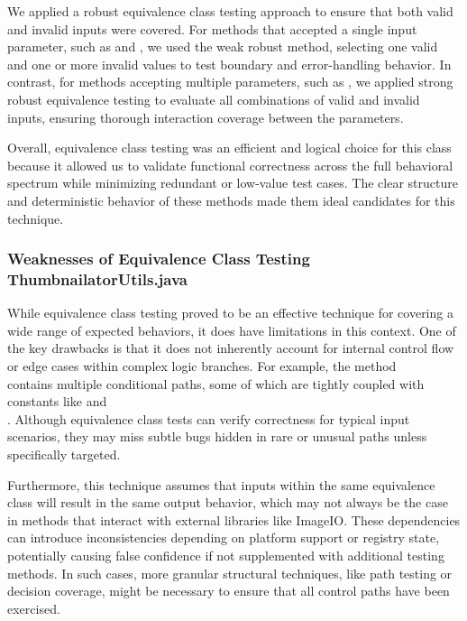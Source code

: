 \documentclass[12pt]{article}
\begin{document}
    We applied a robust equivalence class testing approach to ensure that both
        valid and invalid inputs were covered.
    For methods that accepted a single input parameter, such as
         and
        , we used the weak robust
        method, selecting one valid and one or more invalid values to test
        boundary and error-handling behavior.
    In contrast, for methods accepting multiple parameters, such as
        , we
        applied strong robust equivalence testing to evaluate all combinations
        of valid and invalid inputs, ensuring thorough interaction coverage
        between the parameters.

    Overall, equivalence class testing was an efficient and logical choice for
        this class because it allowed us to validate functional correctness
        across the full behavioral spectrum while minimizing redundant or
        low-value test cases.
    The clear structure and deterministic behavior of these methods made them
        ideal candidates for this technique.

    \markboth{}{}
    \subsubsection{Weaknesses of Equivalence Class Testing ThumbnailatorUtils.java}
    \markboth{}{}

    While equivalence class testing proved to be an effective technique for
        covering a wide range of expected behaviors, it does have limitations in
        this context.
    One of the key drawbacks is that it does not inherently account for internal
        control flow or edge cases within complex logic branches.
    For example, the method\\
     contains
        multiple conditional paths, some of which are tightly coupled with
        constants like  and\\
        .
    Although equivalence class tests can verify correctness for typical input
        scenarios, they may miss subtle bugs hidden in rare or unusual paths
        unless specifically targeted.

    Furthermore, this technique assumes that inputs within the same equivalence
        class will result in the same output behavior, which may not always be
        the case in methods that interact with external libraries like ImageIO.
    These dependencies can introduce inconsistencies depending on platform
        support or registry state, potentially causing false confidence if not
        supplemented with additional testing methods.
    In such cases, more granular structural techniques, like path testing or
        decision coverage, might be necessary to ensure that all control paths
        have been exercised.
\end{document}

